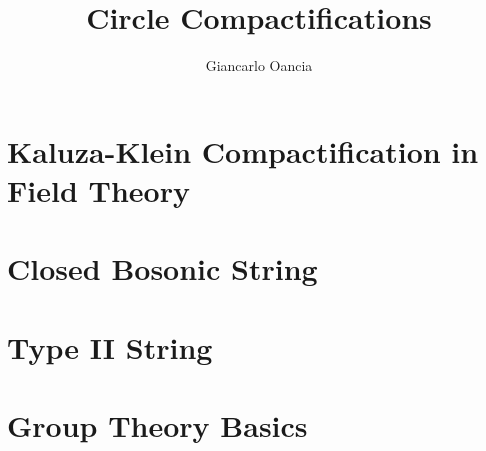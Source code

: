\documentclass[a4paper,11pt]{report}
\title{Circle Compactifications}
\author[a]{Giancarlo Oancia}
\affiliation[a]{University of Bologna}
\begin{document}
\maketitle
\flushbottom
{}

\chapter{Kaluza-Klein Compactification in Field Theory}


\chapter{Closed Bosonic String}


\chapter{Type II String}


\appendix
\chapter{Group Theory Basics}



\end{document}

